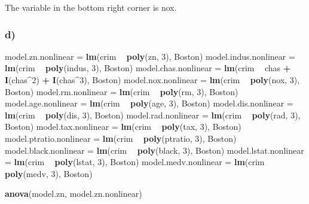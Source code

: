\documentclass[]{article}
\newenvironment{Shaded}{\begin{snugshade}}{\end{snugshade}}
\newcommand{\KeywordTok}[1]{\textcolor[rgb]{0.13,0.29,0.53}{\textbf{#1}}}
\newcommand{\DecValTok}[1]{\textcolor[rgb]{0.00,0.00,0.81}{#1}}
\newcommand{\StringTok}[1]{\textcolor[rgb]{0.31,0.60,0.02}{#1}}
\newcommand{\OperatorTok}[1]{\textcolor[rgb]{0.81,0.36,0.00}{\textbf{#1}}}
\newcommand{\NormalTok}[1]{#1}
\begin{document}
The variable in the bottom right corner is nox.

\subsubsection{d)}\label{d-2}

\begin{Shaded}
\begin{Highlighting}[]
\NormalTok{model.zn.nonlinear =}\StringTok{ }\KeywordTok{lm}\NormalTok{(crim }\OperatorTok{~}\StringTok{ }\KeywordTok{poly}\NormalTok{(zn, }\DecValTok{3}\NormalTok{), Boston)}
\NormalTok{model.indus.nonlinear =}\StringTok{ }\KeywordTok{lm}\NormalTok{(crim }\OperatorTok{~}\StringTok{ }\KeywordTok{poly}\NormalTok{(indus, }\DecValTok{3}\NormalTok{), Boston)}
\NormalTok{model.chas.nonlinear =}\StringTok{ }\KeywordTok{lm}\NormalTok{(crim }\OperatorTok{~}\StringTok{ }\NormalTok{chas }\OperatorTok{+}\StringTok{ }\KeywordTok{I}\NormalTok{(chas}\OperatorTok{^}\DecValTok{2}\NormalTok{) }\OperatorTok{+}\StringTok{ }\KeywordTok{I}\NormalTok{(chas}\OperatorTok{^}\DecValTok{3}\NormalTok{), Boston)}
\NormalTok{model.nox.nonlinear =}\StringTok{ }\KeywordTok{lm}\NormalTok{(crim }\OperatorTok{~}\StringTok{ }\KeywordTok{poly}\NormalTok{(nox, }\DecValTok{3}\NormalTok{), Boston)}
\NormalTok{model.rm.nonlinear =}\StringTok{ }\KeywordTok{lm}\NormalTok{(crim }\OperatorTok{~}\StringTok{ }\KeywordTok{poly}\NormalTok{(rm, }\DecValTok{3}\NormalTok{), Boston)}
\NormalTok{model.age.nonlinear =}\StringTok{ }\KeywordTok{lm}\NormalTok{(crim }\OperatorTok{~}\StringTok{ }\KeywordTok{poly}\NormalTok{(age, }\DecValTok{3}\NormalTok{), Boston)}
\NormalTok{model.dis.nonlinear =}\StringTok{ }\KeywordTok{lm}\NormalTok{(crim }\OperatorTok{~}\StringTok{ }\KeywordTok{poly}\NormalTok{(dis, }\DecValTok{3}\NormalTok{), Boston)}
\NormalTok{model.rad.nonlinear =}\StringTok{ }\KeywordTok{lm}\NormalTok{(crim }\OperatorTok{~}\StringTok{ }\KeywordTok{poly}\NormalTok{(rad, }\DecValTok{3}\NormalTok{), Boston)}
\NormalTok{model.tax.nonlinear =}\StringTok{ }\KeywordTok{lm}\NormalTok{(crim }\OperatorTok{~}\StringTok{ }\KeywordTok{poly}\NormalTok{(tax, }\DecValTok{3}\NormalTok{), Boston)}
\NormalTok{model.ptratio.nonlinear =}\StringTok{ }\KeywordTok{lm}\NormalTok{(crim }\OperatorTok{~}\StringTok{ }\KeywordTok{poly}\NormalTok{(ptratio, }\DecValTok{3}\NormalTok{), Boston)}
\NormalTok{model.black.nonlinear =}\StringTok{ }\KeywordTok{lm}\NormalTok{(crim }\OperatorTok{~}\StringTok{ }\KeywordTok{poly}\NormalTok{(black, }\DecValTok{3}\NormalTok{), Boston)}
\NormalTok{model.lstat.nonlinear =}\StringTok{ }\KeywordTok{lm}\NormalTok{(crim }\OperatorTok{~}\StringTok{ }\KeywordTok{poly}\NormalTok{(lstat, }\DecValTok{3}\NormalTok{), Boston)}
\NormalTok{model.medv.nonlinear =}\StringTok{ }\KeywordTok{lm}\NormalTok{(crim }\OperatorTok{~}\StringTok{ }\KeywordTok{poly}\NormalTok{(medv, }\DecValTok{3}\NormalTok{), Boston)}

\KeywordTok{anova}\NormalTok{(model.zn, model.zn.nonlinear)}
\end{Highlighting}
\end{Shaded}
\end{document}
